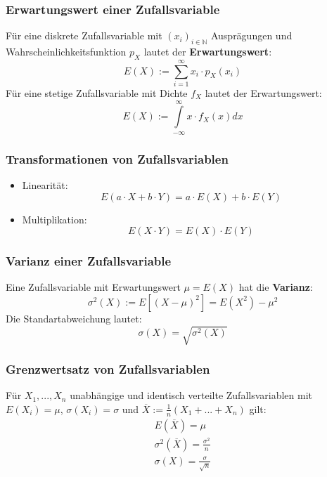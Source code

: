 \documentclass[12pt]{article}
\begin{document}
\subsubsection{Erwartungswert einer Zufallsvariable}
Für eine diskrete Zufallsvariable mit $(x_i)_{i\in \mathbb{N}}$ Ausprägungen und Wahrscheinlichkeitsfunktion $p_X$ lautet der \textbf{Erwartungswert}:
\begin{equation*}
	E(X):=\sum\limits_{i=1}^\infty x_i\cdot p_X(x_i)
\end{equation*}
Für eine stetige Zufallsvariable mit Dichte $f_X$ lautet der Erwartungswert:
\begin{equation*}
	E(X):=\int\limits_{-\infty}^\infty x\cdot f_X(x) dx
\end{equation*}
\subsubsection{Transformationen von Zufallsvariablen}
\begin{itemize}
	\item Linearität:
	\begin{equation*}
		E(a\cdot X + b\cdot Y)=a\cdot E(X)+b\cdot E(Y)
	\end{equation*}
	\item Multiplikation:
	\begin{equation*}
		E(X\cdot Y) = E(X)\cdot E(Y)
	\end{equation*}
\end{itemize}
\subsubsection{Varianz einer Zufallsvariable}
Eine Zufallsvariable mit Erwartungswert $\mu = E(X)$ hat die \textbf{Varianz}:
\begin{equation*}
	\sigma^2(X):=E[(X-\mu)^2]=E(X^2)-\mu^2
\end{equation*}
Die Standartabweichung lautet:
\begin{equation*}
	\sigma(X) = \sqrt{\sigma^2(X)}
\end{equation*}
\subsubsection{Grenzwertsatz von Zufallsvariablen}
Für $X_1,...,X_n$ unabhängige und identisch verteilte Zufallsvariablen mit $E(X_i)=\mu$, $\sigma(X_i)=\sigma$ und $\overline{X}:=\frac{1}{n}(X_1+...+X_n)$ gilt:
\begin{gather*}
	E(\overline{X})=\mu \\
	\sigma^2(\overline{X})=\frac{\sigma^2}{n}\\
	\sigma(X)=\frac{\sigma}{\sqrt{n}}
\end{gather*}
\end{document}
